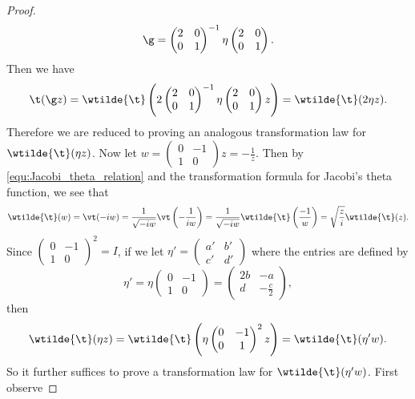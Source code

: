 \begin{proof}
        \[
          \g = \begin{pmatrix} 2 & 0 \\ 0 & 1 \end{pmatrix}^{-1} \eta \begin{pmatrix} 2 & 0 \\ 0 & 1 \end{pmatrix}.
        \]
        Then we have
        \[
          \t(\g z) = \wtilde{\t}\left(2\begin{pmatrix} 2 & 0 \\ 0 & 1 \end{pmatrix}^{-1} \eta \begin{pmatrix} 2 & 0 \\ 0 & 1 \end{pmatrix}z\right) = \wtilde{\t}(2\eta z).
        \]
        Therefore we are reduced to proving an analogous transformation law for $\wtilde{\t}(\eta z)$. Now let $w = \begin{pmatrix} 0 & -1 \\ 1 & 0 \end{pmatrix}z = -\frac{1}{z}$. Then by \cref{equ:Jacobi_theta_relation} and the transformation formula for Jacobi's theta function, we see that
        \[
          \wtilde{\t}(w) = \vt(-iw) = \frac{1}{\sqrt{-iw}}\vt\left(-\frac{1}{iw}\right) = \frac{1}{\sqrt{-iw}}\wtilde{\t}\left(\frac{-1}{w}\right) = \sqrt{\frac{z}{i}}\wtilde{\t}(z).
        \]
        Since $\begin{pmatrix} 0 & -1 \\ 1 & 0 \end{pmatrix}^{2} = I$, if we let $\eta' = \begin{pmatrix} a' & b' \\ c' & d' \end{pmatrix}$ where the entries are defined by
        \[
          \eta' = \eta\begin{pmatrix} 0 & -1 \\ 1 & 0 \end{pmatrix} = \begin{pmatrix} 2b & -a \\ d & -\frac{c}{2} \end{pmatrix},
        \]
        then
        \[
          \wtilde{\t}(\eta z) = \wtilde{\t}\left(\eta \begin{pmatrix} 0 & -1 \\ 0 & 1 \end{pmatrix}^{2} z\right) = \wtilde{\t}(\eta'w).
        \]
        So it further suffices to prove a transformation law for $\wtilde{\t}(\eta'w)$. First observe

\end{proof}

